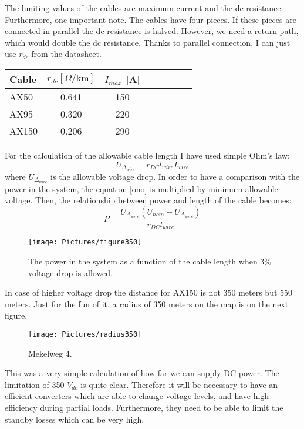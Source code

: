 \documentclass[]{scrartcl}
\begin{document}
The limiting values of the cables are maximum current and the dc resistance. Furthermore, one important note. The cables have four pieces. If  these pieces are connected in parallel the dc resistance is halved. However, we need a return path, which would double the dc resistance. Thanks to parallel connection, I can just use $r_{dc}$ from the datasheet. 
\begin{center}
	\begin{tabular}{l*{6}{c}r}
		Cable             & $r_{dc} [\Omega/\text{km}]$ & $I_{max}$ [A]  \\
		\hline
		\hline
		AX50  & 0.641 & 150   \\
		AX95  & 0.320 & 220   \\
		AX150 & 0.206 & 290   \\
	\end{tabular}
\end{center}


For the calculation of the allowable cable length I have used simple Ohm's law:
\begin{equation}
U_{\Delta_{wire}} = r_{DC}l_{wire}I_{wire}
\label{ono}
\end{equation}
where $U_{\Delta_{wire}}$ is the allowable voltage drop. In order to have a comparison with the power in the system, the equation \ref{ono} is multiplied by minimum allowable voltage. Then, the relationship between power and length of the cable becomes:
\begin{equation}
P = \frac{U_{\Delta_{wire}}\left(U_{nom}-U_{\Delta_{wire}}\right)}{r_{DC}l_{wire}}
\end{equation}
\begin{figure}[h!]
	\centering
	\texttt{[image: Pictures/figure350]}
	\caption{The power in the system as a function of the cable length when 3\% voltage drop is allowed.}
	\label{fig:figure350}
\end{figure}
In case of higher voltage drop the distance for AX150 is not 350 meters but 550 meters. Just for the fun of it, a radius of 350 meters on the map is on the next figure.
\begin{figure}[h!]
	\centering
	\texttt{[image: Pictures/radius350]}
	\caption{Mekelweg 4.}
	\label{fig:radius350}
\end{figure}

This was a very simple calculation of how far we can supply DC power. The limitation of 350 $V_{dc}$ is quite clear. Therefore it will be necessary to have an efficient converters which are able to change voltage levels, and have high efficiency during partial loads. Furthermore, they need to be able to limit the standby losses which can be very high.





	\newpage
	{}
	
\end{document}
